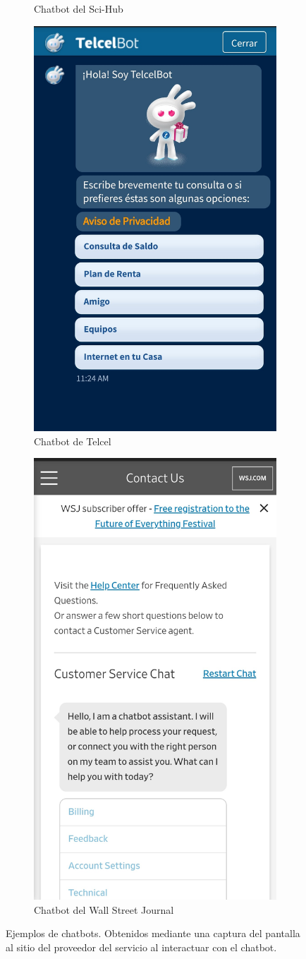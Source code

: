\begin{figure}[h]
\begin{subfigure}{0.45\linewidth}
		\caption{Chatbot del Sci-Hub}
		\label{fig:chatbotscihub}
	\end{subfigure}
	\begin{subfigure}{0.45\linewidth}
		\centering
		\includegraphics[width=0.45\linewidth]{img/chatbottelcel}
		\caption{Chatbot de Telcel}
		\label{fig:chatbottelcel}
	\end{subfigure}
	\begin{subfigure}{0.45\linewidth}
		\centering
		\includegraphics[width=0.45\linewidth]{img/chatbotwsj}
		\caption{Chatbot del Wall Street Journal}
		\label{fig:chatbotwsj}
	\end{subfigure}
	\caption{Ejemplos de chatbots. Obtenidos mediante una captura del pantalla al sitio del proveedor del servicio al interactuar con el chatbot.}
	\label{fig:chatbots}
\end{figure}

